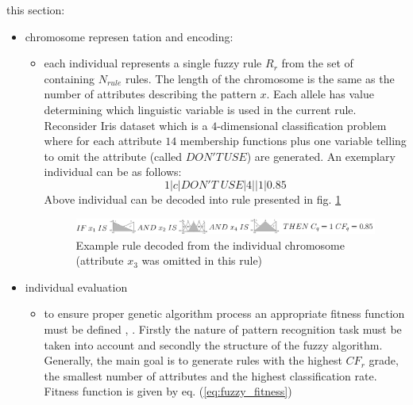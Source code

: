 this section:
\begin{itemize}
    \item chromosome represen tation and encoding: 
        \begin{itemize}
            \item each individual represents a single fuzzy rule $R_r$ from the
                set of containing $N_{rule}$ rules.
                The length of the chromosome is the same as the number of 
                attributes describing the pattern $x$. Each allele has value
                determining which linguistic variable is used in the current
                rule. Reconsider Iris dataset which is a $4$-dimensional
                classification problem where for each attribute $14$
                membership functions plus one variable telling to omit the
                attribute (called $DON'T \,USE$) are generated. 
                An exemplary individual can be as follows:
                $$1|c|DON'T \;USE|4||1|0.85$$
                Above individual can be decoded into rule presented in fig.
                \ref{fig:fuzzy_rule}
                \begin{figure}[H]
                    \begin{center}
                        \includegraphics[width=\textwidth]{fig/fuzzy_rule.png}
                    \end{center}
                    \caption{Example rule decoded from the individual
                    chromosome (attribute $x_3$ was omitted in this rule)}
                    \label{fig:fuzzy_rule}
                \end{figure}  
        \end{itemize}
    \item individual evaluation
        \begin{itemize}
            \item to ensure proper genetic algorithm process an appropriate
                fitness function must be defined \cite{bib10}, \cite{bib21}. 
                Firstly the nature of pattern recognition task must be taken 
                into account and secondly the structure of the fuzzy algorithm. 
                Generally, the main goal is
                to generate rules with the highest $CF_r$ grade, the smallest number
                of attributes and the highest classification rate. Fitness
                function is given by eq. (\ref{eq:fuzzy_fitness})

\end{itemize}
\end{itemize}
